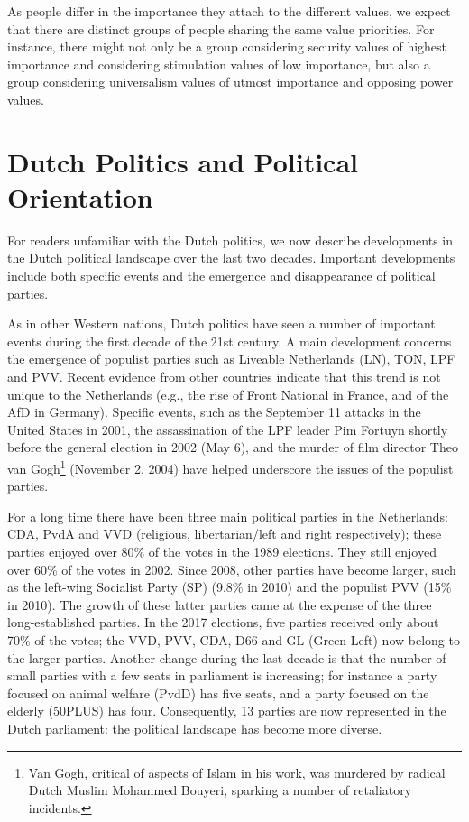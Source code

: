 \documentclass[12pt,letter]{article}\usepackage[]{graphicx}\usepackage[]{xcolor}
\begin{document}
As people differ in the importance they attach to the different values, we expect that there are distinct groups of people sharing the same value priorities. For instance, there might not only be a group considering security values of highest importance and considering stimulation values of low importance, but also a group considering universalism values of utmost importance and opposing power values. 

 
\section*{Dutch Politics and Political Orientation}
For readers unfamiliar with the Dutch politics, we now describe developments in the Dutch political landscape over the last two decades. Important developments include both specific events and the emergence and disappearance of political parties.

As in other Western nations, Dutch politics have seen a number of important events during the first decade of the 21st century. A main development concerns the emergence of populist parties such as Liveable Netherlands (LN), TON, LPF and PVV. Recent evidence from other countries indicate that this trend is not unique to the Netherlands (e.g., the rise of Front National in France, and of the AfD in Germany). Specific events, such as the September 11 attacks in the United States in 2001, the assassination of the LPF leader Pim Fortuyn shortly before the general election in 2002 (May 6), and the murder of film director Theo van Gogh\footnote{Van Gogh, critical of aspects of Islam in his work, was murdered by radical Dutch Muslim Mohammed Bouyeri, sparking a number of retaliatory incidents.} (November 2, 2004) have helped underscore the issues of the populist parties.   

For a long time there have been three main political parties in the Netherlands: CDA, PvdA and VVD (religious, libertarian/left and right respectively); these parties enjoyed over 80\% of the votes in the 1989 elections. They still enjoyed over 60\% of the votes in 2002. Since 2008, other parties have become larger, such as the left-wing Socialist Party (SP) (9.8\% in 2010) and the populist PVV (15\% in 2010). The growth of these latter parties came at the expense of the three long-established parties. In the 2017 elections, five parties received only about 70\% of the votes; the VVD, PVV, CDA, D66 and GL (Green Left) now belong to the larger parties. Another change during the last decade is that the number of small parties with a few seats in parliament is increasing; for instance a party focused on animal welfare (PvdD) has five seats, and a party focused on the elderly (50PLUS) has four. Consequently, 13 parties are now represented in the Dutch parliament: the political landscape has become more diverse. 
\end{document}
